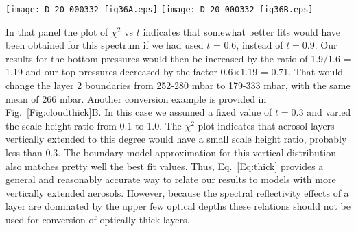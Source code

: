 \documentclass[article,11pt]{emulateapj}
\def\chisq{$\chi^2$ }
\begin{document}
\begin{figure*}[!htb]\centering
\texttt{[image: D-20-000332\_fig36A.eps]}
\texttt{[image: D-20-000332\_fig36B.eps]}
\caption{{\bf A:} Best fit cloud pressure boundaries retrieved
from the location-3 2016 spectrum as a function of
  the assumed ratio of top to bottom pressures (solid curves) compared
  to approximations (red dashed curves) based on the assumption that
  the mean cloud pressure is fixed to the sheet cloud value (dashed
  curve).  In this case the particle scale height is equal to the pressure
scale height. {\bf B:} Best fit pressure boundaries as a function of
  particle to gas scale height ratio (solid curves) for diffuse particle layers
with a top pressure boundary that is just 30\% of the bottom pressure, compared to
  approximations (red dashed curves) for those boundaries based on assuming that the mean
  pressure of the cloud remains fixed at all scale height ratios.
  Layer 2 is plotted in green at the right to help follow the
  boundaries that overlap with those of layer 3.  The bottom panels
  display the \chisq values for each fit.}
\label{Fig:cloudthick}
\end{figure*}

In that panel the plot of \chisq vs $t$ indicates that somewhat better
fits would have been obtained for this spectrum if we had used $t$ =
0.6, instead of $t=0.9$.  Our results for the bottom pressures would
then be increased by the ratio of 1.9/1.6 = 1.19 and our top pressures
decreased by the factor 0.6$\times$1.19 = 0.71.  That would change the
layer 2 boundaries from 252-280 mbar to 179-333 mbar, with the same
mean of 266 mbar.  Another conversion example is provided in
Fig.\ \ref{Fig:cloudthick}B. In this case we assumed a fixed value of
$t=0.3$ and varied the scale height ratio from 0.1 to 1.0.  The \chisq
plot indicates that aerosol layers vertically extended to this degree would have a
small scale height ratio, probably less than 0.3.  The boundary
model approximation for this vertical distribution also matches pretty
well the best fit values.  Thus, Eq.\ \ref{Eq:thick} provides a
general and reasonably accurate way to relate our results to models
with more vertically extended aerosols.  However, because the spectral
reflectivity effects of a layer are dominated by the upper few optical
depths these relations should not be used for conversion of optically
thick layers.
\end{document}
